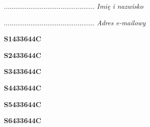 \begin{turn}{90}\begin{minipage}{\linewidth} \vspace{20mm} ................................................  \textit{Imię i nazwisko}\end{minipage}\end{turn}

\begin{turn}{90}\begin{minipage}{\linewidth} \vspace{20mm} ................................................  \textit{Adres e-mailowy}\end{minipage}\end{turn}

\begin{turn}{90}\huge \begin{minipage}{\linewidth} \vspace{10mm}\textbf{S1433644C}\end{minipage}\end{turn}

\begin{turn}{90}\huge \begin{minipage}{\linewidth} \vspace{10mm}\textbf{S2433644C}\end{minipage}\end{turn}

\begin{turn}{90}\huge \begin{minipage}{\linewidth} \vspace{10mm}\textbf{S3433644C}\end{minipage}\end{turn}

\begin{turn}{90}\huge \begin{minipage}{\linewidth} \vspace{10mm}\textbf{S4433644C}\end{minipage}\end{turn}

\begin{turn}{90}\huge \begin{minipage}{\linewidth} \vspace{10mm}\textbf{S5433644C}\end{minipage}\end{turn}

\begin{turn}{90}\huge \begin{minipage}{\linewidth} \vspace{10mm}\textbf{S6433644C}\end{minipage}\end{turn}

